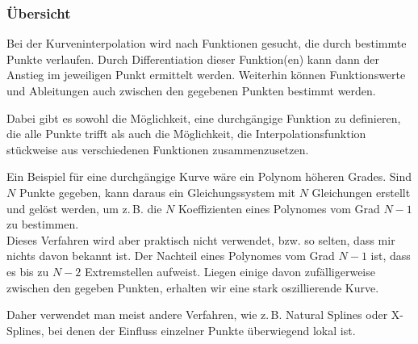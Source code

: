 \documentclass[ngerman,origlongtable]{scrartcl}
\begin{document}
\subsubsection{Übersicht}
Bei der Kurveninterpolation wird nach Funktionen gesucht, die durch
bestimmte Punkte verlaufen. Durch Differentiation dieser Funktion(en)
kann dann der Anstieg im jeweiligen Punkt ermittelt werden. Weiterhin
können Funktionswerte und Ableitungen auch zwischen den gegebenen Punkten
bestimmt werden.

Dabei gibt es sowohl die Möglichkeit, eine durchgängige Funktion
zu definieren, die alle Punkte trifft als auch die Möglichkeit, die
Interpolationsfunktion stückweise aus verschiedenen Funktionen zusammenzusetzen.

Ein Beispiel für eine durchgängige Kurve wäre ein Polynom höheren Grades.
Sind \(N\) Punkte gegeben, kann daraus ein Gleichungssystem mit \(N\)
Gleichungen erstellt und gelöst werden, um z.\,B. die \(N\) Koeffizienten
eines Polynomes vom Grad \(N-1\) zu bestimmen.\\
Dieses Verfahren wird aber praktisch nicht verwendet, bzw. so selten, dass
mir nichts davon bekannt ist. Der Nachteil eines Polynomes vom Grad
\(N-1\) ist, dass es bis zu \(N-2\) Extremstellen aufweist. Liegen einige
davon zufälligerweise zwischen den gegeben Punkten, erhalten wir eine stark
oszillierende Kurve.

Daher verwendet man meist andere Verfahren, wie z.\,B. Natural Splines
oder X-Splines, bei denen der Einfluss einzelner Punkte überwiegend lokal ist.
\end{document}
